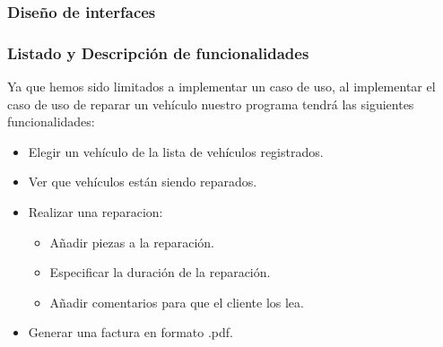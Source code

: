 \documentclass{article}
\begin{document}
\subsubsection{Diseño de interfaces}
\subsubsection{Listado y Descripción de funcionalidades}
Ya que hemos sido limitados a implementar un caso de uso, al implementar el caso de uso de reparar un vehículo nuestro programa tendrá las siguientes funcionalidades:\\
\begin{itemize}
  \item Elegir un vehículo de la lista de vehículos registrados.
  \item Ver que vehículos están siendo reparados.
  \item Realizar una reparacion: \begin{itemize}
    \item Añadir piezas a la reparación.
    \item Especificar la duración de la reparación.
    \item Añadir comentarios para que el cliente los lea.
  \end{itemize}
  \item Generar una factura en formato .pdf.
\end{itemize}
\end{document}
